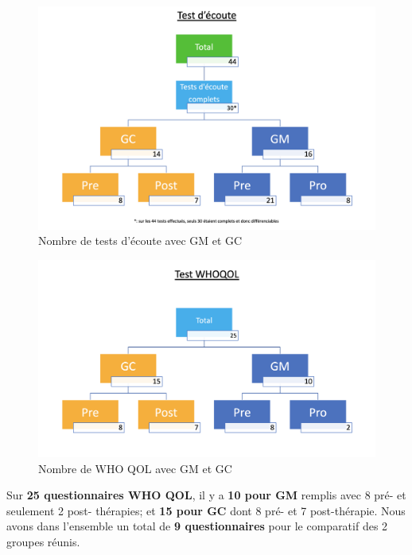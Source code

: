 \begin{figure}
\centering
\includegraphics[width=1\linewidth]{images/graphiques/Testecoute.png}
\caption{Nombre de tests d'écoute avec GM et GC}

\end{figure}



     \begin{figure}
     \centering
     \includegraphics[width=1\linewidth]{images/graphiques/TestWQ.png}
     \caption{Nombre de WHO QOL avec GM et GC}
\end{figure}


Sur \textbf{25 questionnaires WHO QOL}, il y a \textbf{10 pour GM} remplis
avec 8 pré- et seulement 2
     post- thérapies; et \textbf{15 pour GC} dont 8 pré-
     et 7 post-thérapie.
      Nous avons dans l'ensemble un total de \textbf{9 questionnaires} pour le
     comparatif des 2 groupes réunis.


